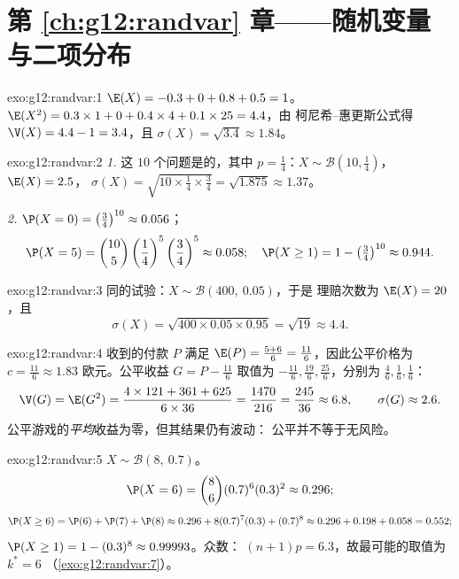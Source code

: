 \section*{第 \ref{ch:g12:randvar} 章——随机变量与二项分布}

\begin{solution}{exo:g12:randvar:1}
$\E(X) = -0.3 + 0 + 0.8 + 0.5 = 1$。
$\E(X^2) = 0.3 \times 1 + 0 + 0.4\times4 + 0.1\times25 = 4.4$，由
柯尼希–惠更斯公式得 $\V(X) = 4.4 - 1 = 3.4$，且
$\sigma(X) = \sqrt{3.4} \approx 1.84$。
\end{solution}

\begin{solution}{exo:g12:randvar:2}
\emph{1.} 这 $10$ 个问题是的，其中
$p = \frac14$：$X \sim \mathcal B\left(10, \frac14\right)$，
$\E(X) = 2.5$，
$\sigma(X) = \sqrt{10 \times \frac14 \times \frac34} = \sqrt{1.875}
\approx 1.37$。

\emph{2.} $\P(X = 0) = \left(\frac34\right)^{10} \approx 0.056$；
\[
\P(X = 5) = \binom{10}{5}\left(\frac14\right)^5\left(\frac34\right)^5
\approx 0.058;
\quad
\P(X \geq 1) = 1 - \left(\tfrac34\right)^{10} \approx 0.944 .
\]
\end{solution}

\begin{solution}{exo:g12:randvar:3}
同的试验：$X \sim \mathcal B(400,\ 0.05)$，于是
理赔次数为 $\E(X) = 20$，且
\[
\sigma(X) = \sqrt{400 \times 0.05 \times 0.95} = \sqrt{19} \approx 4.4 .
\]
\end{solution}

\begin{solution}{exo:g12:randvar:4}
收到的付款 $P$ 满足
$\E(P) = \frac{5 + 6}{6} = \frac{11}{6}$，因此公平价格为
$c = \frac{11}{6} \approx 1.83$ 欧元。公平收益 $G = P - \frac{11}6$
取值为 $-\frac{11}{6}, \frac{19}{6}, \frac{25}{6}$，分别为
$\frac46, \frac16, \frac16$：
\[
\V(G) = \E(G^2)
= \frac{4 \times 121 + 361 + 625}{6 \times 36} = \frac{1470}{216}
= \frac{245}{36} \approx 6.8,
\qquad \sigma(G) \approx 2.6 .
\]
公平游戏的\emph{平均}收益为零，但其结果仍有波动：
公平并不等于无风险。
\end{solution}

\begin{solution}{exo:g12:randvar:5}
$X \sim \mathcal B(8,\ 0.7)$。
\[
\P(X = 6) = \binom86 (0.7)^6(0.3)^2 \approx 0.296 ;
\]
\[
\P(X \geq 6) = \P(6) + \P(7) + \P(8)
\approx 0.296 + 8(0.7)^7(0.3) + (0.7)^8
\approx 0.296 + 0.198 + 0.058 = 0.552 ;
\]
$\P(X \geq 1) = 1 - (0.3)^8 \approx 0.99993$。众数：
$(n+1)p = 6.3$，故最可能的取值为 $k^* = 6$
（\cref{exo:g12:randvar:7}）。
\end{solution}

